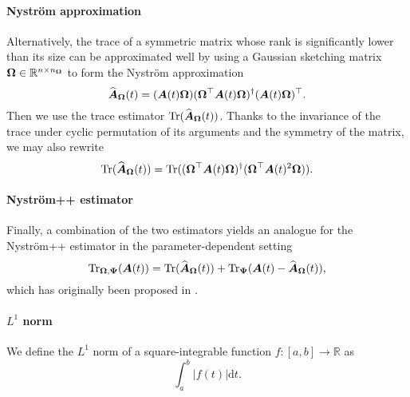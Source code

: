 \documentclass[12pt]{article}
\begin{document}
\paragraph{Nyström approximation} Alternatively, the trace of a symmetric matrix whose rank is significantly lower than its size can be approximated well by using a Gaussian sketching matrix $\boldsymbol{\Omega} \in \mathbb{R}^{n \times n_{\boldsymbol{\Omega}}}$ to form the Nyström approximation \cite{gittens-2013-revisiting-nystrom}
\begin{equation}
    \widehat{\boldsymbol{A}}_{\boldsymbol{\Omega}}(t) = (\boldsymbol{A}(t) \boldsymbol{\Omega}) (\boldsymbol{\Omega}^{\top} \boldsymbol{A}(t) \boldsymbol{\Omega})^{\dagger} (\boldsymbol{A}(t) \boldsymbol{\Omega})^{\top}.
\end{equation}
Then we use the trace estimator $\operatorname{Tr}(\widehat{\boldsymbol{A}}_{\boldsymbol{\Omega}}(t))$. Thanks to the invariance of the trace under cyclic permutation of its arguments and the symmetry of the matrix, we may also rewrite
\begin{equation}
    \operatorname{Tr}(\widehat{\boldsymbol{A}}_{\boldsymbol{\Omega}}(t)) = \operatorname{Tr}( (\boldsymbol{\Omega}^{\top} \boldsymbol{A}(t) \boldsymbol{\Omega})^{\dagger} ( \boldsymbol{\Omega}^{\top} \boldsymbol{A}(t)^2 \boldsymbol{\Omega})).
    \label{equ:nystrom-trace-estimator}
\end{equation}

\paragraph{Nyström++ estimator} Finally, a combination of the two estimators yields an analogue for the Nyström++ estimator \cite{persson-2022-improved-variants} in the parameter-dependent setting
\begin{equation}
    \operatorname{Tr}_{\boldsymbol{\Omega}, \boldsymbol{\Psi}}(\boldsymbol{A}(t)) = \operatorname{Tr}(\widehat{\boldsymbol{A}}_{\boldsymbol{\Omega}}(t)) + \operatorname{Tr}_{\boldsymbol{\Psi}}(\boldsymbol{A}(t) - \widehat{\boldsymbol{A}}_{\boldsymbol{\Omega}}(t)),
    \label{equ:nystrompp-trace-estimator}
\end{equation}
which has originally been proposed in \cite{lin-2017-randomized-estimation}. %

\paragraph{$L^{1}$ norm}
We define the $L^{1}$ norm of a square-integrable function $f:[a,b] \to \mathbb{R}$ as
\begin{equation}
    \int_{a}^{b} | f(t) | \mathrm{d}t.
\end{equation}
\end{document}
